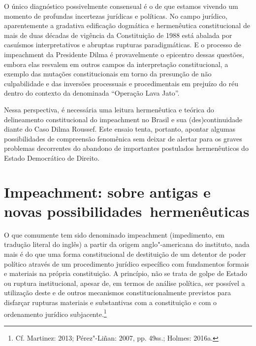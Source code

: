 O único diagnóstico possivelmente consensual é o de que estamos vivendo
um momento de profundas incertezas jurídicas e políticas. No campo
jurídico, aparentemente a gradativa edificação dogmática e hermenêutica
constitucional de mais de duas décadas de vigência da Constituição de
1988 está abalada por casuísmos interpretativos e abruptas rupturas
paradigmáticas. E o processo de impeachment da Presidente Dilma é
provavelmente o epicentro dessas questões, embora elas resvalem em
outros campos da interpretação constitucional, a exemplo das mutações
constitucionais em torno da presunção de não culpabilidade e das
inversões processuais e procedimentais em prejuízo do réu dentro do
contexto da denominada ``Operação Lava Jato''.

Nessa perspectiva, é necessária uma leitura hermenêutica e teórica do
delineamento constitucional do impeachment no Brasil e sua
(des)continuidade diante do Caso Dilma Roussef. Este ensaio tenta,
portanto, apontar algumas possibilidades de compreensão fenomênica sem
deixar de alertar para os graves problemas decorrentes do abandono de
importantes postulados hermenêuticos do Estado Democrático de Direito.

\section{Impeachment: sobre antigas e novas possibilidades~hermenêuticas}

O que comumente tem sido denominado impeachment (impedimento, em
tradução literal do inglês) a partir da origem anglo"-americana do
instituto, nada mais é do que uma forma constitucional de destituição de
um detentor de poder político através de um procedimento jurídico
específico com fundamentos formais e materiais na própria constituição.
A princípio, não se trata de golpe de Estado ou ruptura institucional,
apesar de, em termos de análise política, ser possível a utilização
deste e de outros mecanismos constitucionalmente previstos para
disfarçar rupturas materiais e substantivas com a constituição e com o
ordenamento jurídico subjacente.\footnote{Cf. Martinez: 2013; Pérez"-Liñan: 2007,
pp. 49ss.; Holmes: 2016a.}

